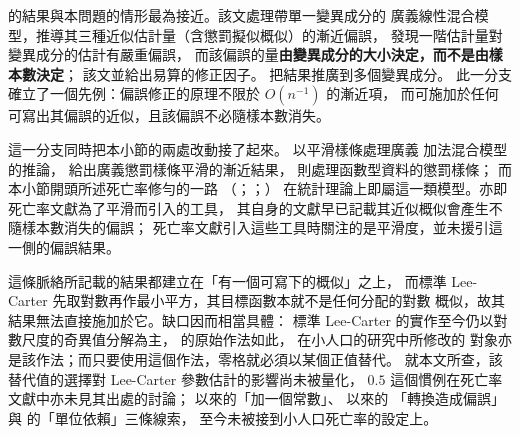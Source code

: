 \citet{breslow1995} 的結果與本問題的情形最為接近。該文處理帶單一變異成分的
廣義線性混合模型，推導其三種近似估計量（含懲罰擬似概似）的漸近偏誤，
發現一階估計量對變異成分的估計有嚴重偏誤，
而該偏誤的量\textbf{由變異成分的大小決定，而不是由樣本數決定}；
該文並給出易算的修正因子。\citet{linbreslow1996} 把結果推廣到多個變異成分。
此一分支確立了一個先例：偏誤修正的原理不限於 $O(n^{-1})$ 的漸近項，
而可施加於任何可寫出其偏誤的近似，且該偏誤不必隨樣本數消失。

這一分支同時把本小節的兩處改動接了起來。\citet{lin1999} 以平滑樣條處理廣義
加法混合模型的推論，\citet{kauermann2009} 給出廣義懲罰樣條平滑的漸近結果，
\citet{xiao2020} 則處理函數型資料的懲罰樣條；
而本小節開頭所述死亡率修勻的一路
（\citealp{currie2004}；\citealp{delwarde2007}；\citealp{currie2013}）
在統計理論上即屬這一類模型。亦即死亡率文獻為了平滑而引入的工具，
其自身的文獻早已記載其近似概似會產生不隨樣本數消失的偏誤；
死亡率文獻引入這些工具時關注的是平滑度，並未援引這一側的偏誤結果。

這條脈絡所記載的結果都建立在「有一個可寫下的概似」之上，
而標準 Lee-Carter 先取對數再作最小平方，其目標函數本就不是任何分配的對數
概似，故其結果無法直接施加於它。缺口因而相當具體：
標準 Lee-Carter 的實作至今仍以對數尺度的奇異值分解為主，
\citet{lee1992} 的原始作法如此，\citet{yue2019} 在小人口的研究中所修改的
對象亦是該作法；而只要使用這個作法，零格就必須以某個正值替代。
就本文所查，該替代值的選擇對 Lee-Carter 參數估計的影響尚未被量化，
$0.5$ 這個慣例在死亡率文獻中亦未見其出處的討論；
\citet{haldane1956} 以來的「加一個常數」、\citet{duan1983} 以來的
「轉換造成偏誤」與 \citet{chenroth2024} 的「單位依賴」三條線索，
至今未被接到小人口死亡率的設定上。
